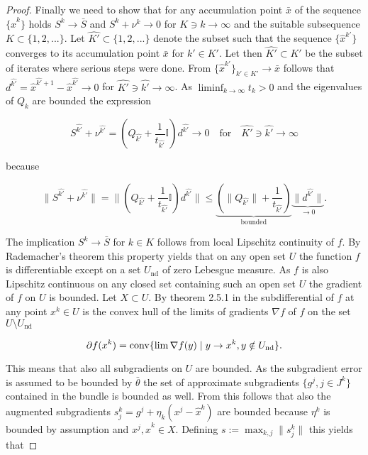 \begin{proof}
	Finally we need to show that for any accumulation point \(\bar{x}\) of the sequence \(\{\hat{x}^k\}\) holds \(S^k \to \bar{S}\) and \(S^k+\nu^k \to 0\) for \(K \ni k \to \infty\) and the suitable subsequence \(K \subset \{1,2,...\}\).
Let \(\hat{K'} \subset \{1,2,...\}\) denote the subset such that the sequence \(\{\hat{x}^{k'}\}\) converges to its accumulation point \(\bar{x}\) for \(k' \in K'\). Let then \(\hat{K'} \subset K'\) be the subset of iterates where serious steps were done. 
From \(\{\hat{x}^{k'}\}_{k' \in K'} \to \bar{x}\)  follows that  \(d^{\hat{k'}} = \hat{x}^{\hat{k'}+1}-\hat{x}^{\hat{k'}} \to 0\) for \(\hat{K'} \ni \hat{k'} \to \infty \). As \(\liminf_{k \to \infty} t_k > 0\) and the eigenvalues of \(Q_k\) are bounded the expression 
	
	\begin{equation*}
	 S^{\hat{k'}} + \nu^{\hat{k'}} = \left(Q_{\hat{k'}}+\frac{1}{t_{\hat{k'}}}\mathbb{I} \right)d^{\hat{k'}}  \to 0 \quad \text{for} \quad \hat{K'} \ni \hat{k'} \to \infty
	\end{equation*}
	
	because 
	
	\[ \|S^{\hat{k'}} + \nu^{\hat{k'}} \| = \|\left(Q_{\hat{k'}}+\frac{1}{t_{\hat{k'}}}\mathbb{I}\right)d^{\hat{k'}} \| \leq \underbrace{\left(\|Q_{\hat{k'}}\|+\frac{1}{t_{\hat{k'}}}\right)}_{\text{bounded}}\underbrace{\|d^{\hat{k'}}\|}_{\to 0}.\]
	
	The implication \(S^k \to \bar{S}\) for \(k \in K\) follows from local Lipschitz continuity of \(f\).
	By Rademacher's theorem this property yields that on any open set \(U\) the function \(f\) is differentiable except on a set \(U_{\text{nd}}\) of zero Lebesgue measure. As \(f\) is also Lipschitz continuous on any closed set containing such an open set \(U\) the gradient of \(f\) on \(U\) is bounded.
	Let \(X \subset U\). By theorem 2.5.1 in \cite{Clarke1990} the subdifferential of \(f\) at any point \(x^k \in U\) is the convex hull of the limits of gradients \(\nabla f\) of \(f\) on the set \(U\setminus U_{\text{nd}}\)
	
		\[ \partial f(x^k) = \text{conv}\{\lim \nabla f(y) \mid y \to x^k, y \notin U_{\text{nd}}\}. \]
		
		This means that also all subgradients on \(U\) are bounded. As the subgradient error is assumed to be bounded by \(\bar{\theta}\) the set of approximate subgradients \(\{g^j, j \in J^k\}\) contained in the bundle is bounded as well.
		From this follows that also the augmented subgradients \(s_j^k = g^j+\eta_k(x^j-\hat{x}^k)\) are bounded because \(\eta^k\) is bounded by assumption and \(x^j, \hat{x}^k \in X\).		
Defining \(s:= \max_{k,j}\|s^k_j\|\) this yields that 
		

\end{proof}

